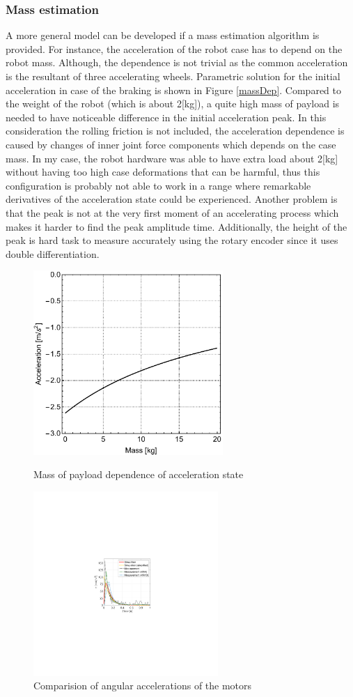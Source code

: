 \documentclass[12pt,english]{article}
\begin{document}
\subsubsection{Mass estimation}
A more general model can be developed if a mass estimation algorithm is provided. For instance, the acceleration of the robot case has to depend on the robot mass. Although, the dependence is not trivial as the common acceleration is the resultant of three accelerating wheels. Parametric solution for the initial acceleration in case of the braking is shown in Figure \ref{massDep}. Compared to the weight of the robot (which is about 2[kg]), a quite high mass of payload is needed to have noticeable difference in the initial acceleration peak. In this consideration the rolling friction is not included, the acceleration dependence is caused by changes of inner joint force components which depends on the case mass. In my case, the robot hardware was able to have extra load about 2[kg] without having too high case deformations that can be harmful, thus this configuration is probably not able to work in a range where remarkable derivatives of the acceleration state could be experienced. Another problem is that the peak is not at the very first moment of an accelerating process which makes it harder to find the peak amplitude time. Additionally, the height of the peak is hard task to measure accurately using the rotary encoder since it uses double differentiation.
\begin{figure}[htb!]
	\centering
	\includegraphics[height=7cm]{figures/massDep}
	\caption{Mass of payload dependence of acceleration state}
	\label{massDep}
	\endminipage\hfill
	\centering
	\includegraphics[height=7cm]{figures/epsilonCompare}
	\caption{Comparision of angular accelerations of the motors}
	\label{epsCompare}
	\endminipage\hfill
\end{figure}
\end{document}
